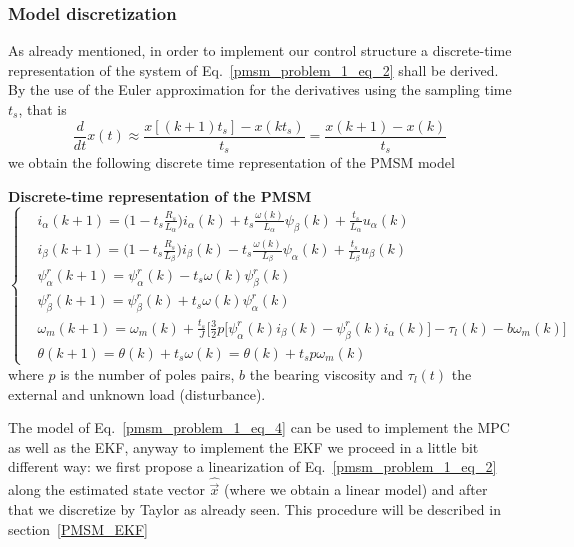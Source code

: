 \documentclass[12pt,a4paper,oneside]{book}
\begin{document}
\begin{onehalfspace}
\subsubsection{Model discretization}
As already mentioned, in order to implement our control structure a discrete-time representation 
of the system of Eq.~\eqref{pmsm_problem_1_eq_2} shall be derived. By the use of 
the Euler approximation for the derivatives using the sampling time $t_s$, that is 
\begin{equation}\label{pmsm_problem_1_eq_3}
	\frac{d}{dt}x(t)\approx\frac{x[(k+1)t_s]-x(kt_s)}{t_s}=\frac{x(k+1)-x(k)}{t_s}
\end{equation}
we obtain the following discrete time representation of the PMSM model
\begin{mybox}
	\textbf{Discrete-time representation of the PMSM}
	\begin{equation}\label{pmsm_problem_1_eq_4}
		\left\lbrace \begin{aligned}
			& i_\alpha(k+1)=\Big(1-t_s\frac{R_s}{L_\alpha}\Big) i_\alpha(k) 
			+t_s\frac{\omega(k)}{L_\alpha}\psi_\beta(k)+\frac{t_s}{L_\alpha}u_\alpha(k)
			\\[6pt]
			& i_\beta(k+1) = \Big(1-t_s\frac{R_s}{L_\beta}\Big)i_\beta(k) 
			-t_s\frac{\omega(k)}{L_\beta}\psi_\alpha(k)+\frac{t_s}{L_\beta}u_\beta(k)
			\\[6pt]
			&\psi_\alpha^r(k+1) = \psi_\alpha^r(k) -t_s\omega(k)\psi_\beta^r(k) 
			\\[6pt]
			&\psi_\beta^r(k+1) = \psi_\beta^r(k) + t_s\omega(k)\psi_\alpha^r(k) 
			\\[6pt]
			&\omega_m(k+1) = \omega_m(k) + \frac{t_s}{J}\Bigg[\frac{3}{2}p 
			\Big[\psi^r_{\alpha}(k)i_{\beta}(k)-\psi^r_{\beta}(k)i_{\alpha}(k)\Big] 
			-\tau_l(k) -b{\omega}_m(k) \Bigg]\\[6pt]
			& {\theta}(k+1) = {\theta}(k) + t_s\omega(k) ={\theta}(k) + t_s 
			p\omega_m(k)
		\end{aligned} \right. 
	\end{equation}
	where $p$ is the number of poles pairs, $b$ the bearing viscosity and 
	$\tau_l(t)$ the external and unknown load (disturbance).
\end{mybox}
The model of Eq.~\eqref{pmsm_problem_1_eq_4} can be used to implement the MPC as well as the EKF, anyway to implement the EKF we proceed in a little bit different way: we first propose a linearization of Eq.~\eqref{pmsm_problem_1_eq_2} along the estimated state vector $\hat{\vec{x}}$ (where we obtain a linear model) and after that we discretize by Taylor as already seen. This procedure will be described in section~\ref{PMSM_EKF}


\end{onehalfspace}
\end{document}
